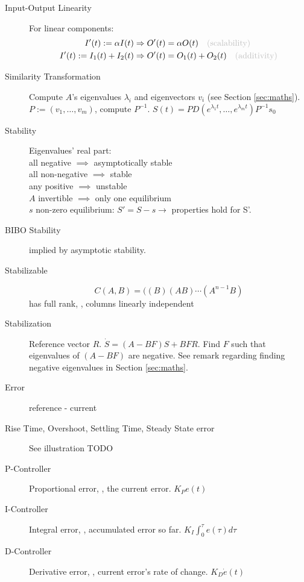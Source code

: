 \begin{description}
	\item[Input-Output Linearity] For linear components: \\
	\begin{align*}
	I'(t) := \alpha I(t) &\Rightarrow O'(t) = \alpha O(t) \NOTE{(scalability)}\\
	I'(t) := I_1(t) + I_2(t) &\Rightarrow O'(t) = O_1(t) + O_2(t) \NOTE{(additivity)}
	\end{align*}
	\item[Similarity Transformation] Compute $A$'s eigenvalues $\lambda_i$ and
	eigenvectors $v_i$ (see Section \ref{sec:maths}).\nl
	$P := (v_1,\ldots, v_m)$, compute $P^{-1}$. \nl
	$S(t) = PD(e^{\lambda_1t}, \ldots, e^{\lambda_mt})P^{-1} s_0$
	\item[Stability] Eigenvalues' real part:\\
    all negative $\implies$ asymptotically stable\\ 
	all non-negative $\implies$ stable\\
    any positive $\implies$ unstable\\
	$A$ invertible $\implies$ only one equilibrium\\
	$s$ non-zero equilibrium: $S' = S - s \rightarrow$ properties hold for S'. 
	\item[BIBO Stability] implied by asymptotic stability.
	\item[Stabilizable] \[C(A,B) = ((B) (AB) \cdots (A^{n-1}B) \] has full rank,
	\ie, columns linearly independent
	\item[Stabilization] Reference vector $R$. $\dot{S} = (A - BF)S + BFR$. Find
	$F$ such that eigenvalues of $(A - BF)$ are negative. See remark regarding
	finding negative eigenvalues in Section \ref{sec:maths}.
	\item[Error] reference - current
	\item[Rise Time, Overshoot, Settling Time, Steady State error] See illustration
	TODO
	\item[P-Controller] Proportional error, \ie, the current error. $K_P e(t)$
	\item[I-Controller] Integral error, \ie, accumulated error so far. $K_I
	\int_0^\tau e(\tau) d\tau$
	\item[D-Controller] Derivative error, \ie, current error's rate of change.
	$K_D \dot{e}(t)$
\end{description}
